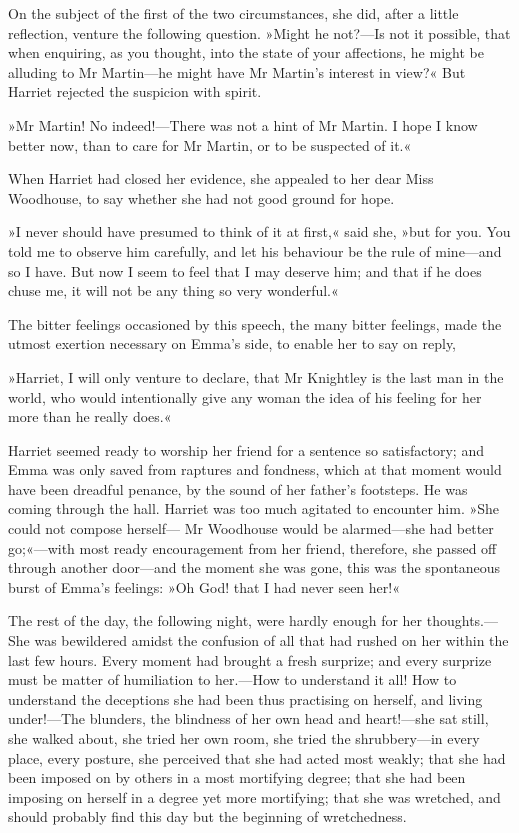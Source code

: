 On the subject of the first of the two circumstances, she did, after a little reflection, venture the following question. »Might he not?—Is not it possible, that when enquiring, as you thought, into the state of your affections, he might be alluding to Mr Martin—he might have Mr Martin's interest in view?« But Harriet rejected the suspicion with spirit.

»Mr Martin! No indeed!—There was not a hint of Mr Martin. I hope I know better now, than to care for Mr Martin, or to be suspected of it.«

When Harriet had closed her evidence, she appealed to her dear Miss Woodhouse, to say whether she had not good ground for hope.

»I never should have presumed to think of it at first,« said she, »but for you. You told me to observe him carefully, and let his behaviour be the rule of mine—and so I have. But now I seem to feel that I may deserve him; and that if he does chuse me, it will not be any thing so very wonderful.«

The bitter feelings occasioned by this speech, the many bitter feelings, made the utmost exertion necessary on Emma's side, to enable her to say on reply,

»Harriet, I will only venture to declare, that Mr Knightley is the last man in the world, who would intentionally give any woman the idea of his feeling for her more than he really does.«

Harriet seemed ready to worship her friend for a sentence so satisfactory; and Emma was only saved from raptures and fondness, which at that moment would have been dreadful penance, by the sound of her father's footsteps. He was coming through the hall. Harriet was too much agitated to encounter him. »She could not compose herself— Mr Woodhouse would be alarmed—she had better go;«—with most ready encouragement from her friend, therefore, she passed off through another door—and the moment she was gone, this was the spontaneous burst of Emma's feelings: »Oh God! that I had never seen her!«

The rest of the day, the following night, were hardly enough for her thoughts.—She was bewildered amidst the confusion of all that had rushed on her within the last few hours. Every moment had brought a fresh surprize; and every surprize must be matter of humiliation to her.—How to understand it all! How to understand the deceptions she had been thus practising on herself, and living under!—The blunders, the blindness of her own head and heart!—she sat still, she walked about, she tried her own room, she tried the shrubbery—in every place, every posture, she perceived that she had acted most weakly; that she had been imposed on by others in a most mortifying degree; that she had been imposing on herself in a degree yet more mortifying; that she was wretched, and should probably find this day but the beginning of wretchedness.

